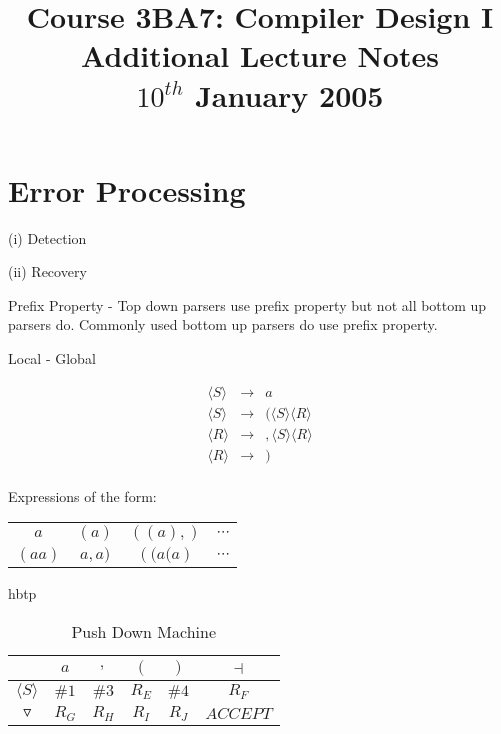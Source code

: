 \documentclass[a4paper,12pt]{article}
\newcommand{\nonterminal}[1]{\langle #1 \rangle}
\begin{document}
\title{Course 3BA7: Compiler Design I \\ Additional Lecture Notes \\	$10^{th}$ January 2005}

\maketitle

\section*{Error Processing}

(i) Detection

(ii) Recovery


Prefix Property - Top down parsers use prefix property but not all 
bottom up parsers do. Commonly used bottom up parsers do use prefix 
property.


Local - Global


\begin{eqnarray}
\nonterminal{S}	&	\to	&	a													\\
\nonterminal{S}	&	\to	&	( \nonterminal{S} \nonterminal{R}	\\
\nonterminal{R}	&	\to	&	, \nonterminal{S} \nonterminal{R}		\\
\nonterminal{R}	&	\to	&	)											\\
\end{eqnarray}


Expressions of the form:

\begin{tabular}{cccc}
$a$						&	$\left( a \right)$	&	$\left( \left( a \right), \right)$	&	$\cdots$	\\
$\left( a a \right)$	&	$ a , a )$		&	$\left( ( a ( a \right)$	&	$\cdots$	\\
\end{tabular}

\begin{table}{hbtp}

\begin{tabular}{|c|c|c|c|c|c|}
\hline
						&	$a$		&	$,$		&	$($		&	$)$		&	$\dashv$		\\
\hline
$\nonterminal{S}$	&	$\#1$		&	$\#3$		&	$R_{E}$	&	$\#4$		&	$R_{F}$		\\
\hline
$\triangledown$	&	$R_{G}$	&	$R_{H}$	&	$R_{I}$	&	$R_{J}$	&	$ACCEPT$		\\
\hline
\end{tabular}

\caption{Push Down Machine}

\end{table}
\end{document}
